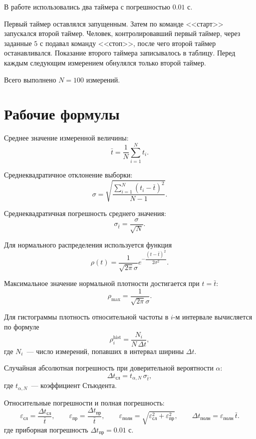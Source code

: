 \documentclass[12pt]{article}
\begin{document}
    В работе использовались два таймера с погрешностью $0.01$ с.
    
    Первый таймер оставлялся запущенным. Затем по команде <<старт>> запускался второй таймер. Человек, контролировавший первый таймер, через заданные $5$ с подавал команду <<стоп>>, после чего второй таймер останавливался. Показание второго таймера записывалось в таблицу. Перед каждым следующим измерением обнулялся только второй таймер.
    
    Всего выполнено $N = 100$ измерений.
    
    \section{Рабочие формулы}
    
    Среднее значение измеренной величины:
    \[
    	\bar t = \frac{1}{N} \sum_{i = 1}^{N} t_i.
    \]
    
    Среднеквадратичное отклонение выборки:
    \[
    	\sigma = \sqrt{\frac{\displaystyle\sum_{i = 1}^{N}(t_i - \bar t)^2}{N - 1}}.
    \]
    
    Среднеквадратичная погрешность среднего значения:
    \[
    	\sigma_{\bar t} = \frac{\sigma}{\sqrt N}.
    \]
    
    Для нормального распределения используется функция
    \[
    	\rho(t) = \frac{1}{\sqrt{2\pi}\sigma} e^{-\dfrac{(t - \bar t)^2}{2 \sigma^2}}.
    \]
    
    Максимальное значение нормальной плотности достигается при $t = \bar t$:
    \[
    	\rho_{\max} = \frac{1}{\sqrt{2 \pi} \sigma}.
    \]
    
    Для гистограммы плотность относительной частоты в $i$-м интервале вычисляется по формуле
    \[
    	\rho_i^{\mathrm{hist}} = \frac{N_i}{N \, \Delta t},
    \]
    где $N_i$~--- число измерений, попавших в интервал ширины $\Delta t$.
    
    Случайная абсолютная погрешность при доверительной вероятности $\alpha$:
    \[
    	\Delta t_{\text{сл}} = t_{\alpha, N} \, \sigma_{\bar t},
    \]
    где $t_{\alpha, N}$~--- коэффициент Стьюдента.
    
    Относительные погрешности и полная погрешность:
    \[
    	\varepsilon_{\text{сл}} = \frac{\Delta t_{\text{сл}}}{\bar t}, \qquad
    	\varepsilon_{\text{пр}} = \frac{\Delta t_{\text{пр}}}{\bar t}, \qquad
    	\varepsilon_{\text{полн}} = \sqrt{\varepsilon_{\text{сл}}^2 + \varepsilon_{\text{пр}}^2}, \qquad
    	\Delta t_{\text{полн}} = \varepsilon_{\text{полн}} \, \bar t.
    \]
    где приборная погрешность $\Delta t_{\text{пр}} = 0.01$ с.
    
\end{document}
